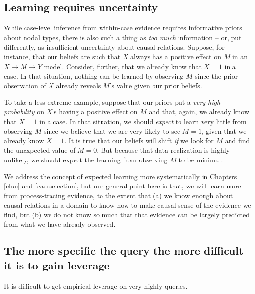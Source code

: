 \documentclass[
  12pt,
]{book}
\begin{document}
\hypertarget{learning-requires-uncertainty}{%
\subsection{Learning requires uncertainty}\label{learning-requires-uncertainty}}

While case-level inference from within-case evidence requires informative priors about nodal types, there is also such a thing as \emph{too much} information -- or, put differently, as insufficient uncertainty about causal relations. Suppose, for instance, that our beliefs are such that \(X\) always has a positive effect on \(M\) in an \(X \rightarrow M \rightarrow Y\) model. Consider, further, that we already know that \(X=1\) in a case. In that situation, nothing can be learned by observing \(M\) since the prior observation of \(X\) already reveals \(M\)'s value given our prior beliefs.

To take a less extreme example, suppose that our priors put a \emph{very high probability} on \(X\)'s having a positive effect on \(M\) and that, again, we already know that \(X=1\) in a case. In that situation, we should \emph{expect} to learn very little from observing \(M\) since we believe that we are very likely to see \(M=1\), given that we already know \(X=1\). It is true that our beliefs will shift \emph{if} we look for \(M\) and find the unexpected value of \(M=0\). But because that data-realization is highly unlikely, we should expect the learning from observing \(M\) to be minimal.

We address the concept of expected learning more systematically in Chapters \ref{clue} and \ref{caseselection}, but our general point here is that, we will learn more from process-tracing evidence, to the extent that (a) we know enough about causal relations in a domain to know how to make causal sense of the evidence we find, but (b) we do not know so much that that evidence can be largely predicted from what we have already observed.

\hypertarget{the-more-specific-the-query-the-more-difficult-it-is-to-gain-leverage}{%
\subsection{The more specific the query the more difficult it is to gain leverage}\label{the-more-specific-the-query-the-more-difficult-it-is-to-gain-leverage}}

It is difficult to get empirical leverage on very highly queries.
\end{document}
